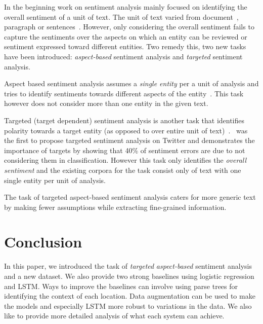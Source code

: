 \documentclass[11pt]{article}
\begin{document}
    In the beginning work on sentiment analysis mainly focused on identifying the overall sentiment of a unit of text. The unit of text varied from document~\cite{pang2002thumbs,turney2002thumbs}, paragraph or sentences~\cite{hu2004mining}. However, only considering the overall sentiment fails to capture the sentiments over the aspects on which an entity can be reviewed or sentiment expressed toward different entities. Two remedy this, two new tasks have been introduced: \emph{aspect-based} sentiment analysis and \emph{targeted} sentiment analysis.
    
    Aspect based sentiment analysis assumes a \emph{single entity} per a unit of analysis and tries to identify sentiments towards different aspects of the entity~\cite{lu2011multi,lakkarajuaspect,alghunaim2015vector,bagheri2013care,somprasertsri2008automatic,alghunaim2015vector,lu2011multi,titov2008modeling,brody2010unsupervised}. This task however does not consider more than one entity in the given text. 

    Targeted (target dependent) sentiment analysis is another task that identifies polarity towards a target entity (as opposed to over entire unit of text)~\cite{mitchell2013open,jiang2011target,dong2014adaptive,vo2015target,zhang2016gated}.~\cite{jiang2011target} was the first to propose targeted sentiment analysis on Twitter and demonstrates the importance of targets by showing that 40\% of sentiment errors are due to not considering them in classification. However this task only identifies the \emph{overall sentiment} and the existing corpora for the task consist only of text with one single entity per unit of analysis.

    The task of targeted aspect-based sentiment analysis caters for more generic text by making fewer assumptions while extracting fine-grained information.
    
\section{Conclusion}
In this paper, we introduced the task of \emph{targeted} \emph{aspect-based} sentiment analysis and a new dataset. We also provide two strong baselines using logistic regression and LSTM. Ways to improve the baselines can involve using parse trees for identifying the context of each location. Data augmentation can be used to make the models and especially LSTM more robust to variations in the data. We also like to provide more detailed analysis of what each system can achieve.



\end{document}
